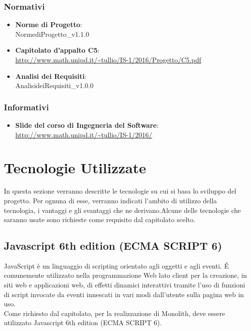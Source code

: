 \subsubsection{Normativi}
\begin{itemize}
	\item \textbf{Norme di Progetto}: \\ NormediProgetto\_v1.1.0
	\item \textbf{Capitolato d'appalto C5}: \\ \url{http://www.math.unipd.it/~tullio/IS-1/2016/Progetto/C5.pdf}
	\item \textbf{Analisi dei Requisiti}: \\ AnalisideiRequisiti\_v1.0.0
	
\end{itemize}


\subsubsection{Informativi}
\begin{itemize}
	\item \textbf{Slide del corso di Ingegneria del Software}: \\  \url{http://www.math.unipd.it/~tullio/IS-1/2016/ }
\end{itemize}

\section{Tecnologie Utilizzate}

In questa sezione verranno descritte le tecnologie su cui si basa lo sviluppo del progetto. Per ognuna di esse, verranno indicati l’ambito di utilizzo della tecnologia, i vantaggi e gli svantaggi che ne derivano.Alcune delle tecnologie che saranno usate sono richieste come requisito dal capitolato scelto.

\subsection{Javascript 6th edition (ECMA SCRIPT 6)}

JavaScript è un linguaggio di scripting orientato agli oggetti e agli eventi. \'E comunemente utilizzato nella programmazione Web lato client per la creazione, in siti web e applicazioni web, di effetti dinamici interattivi tramite l'uso di funzioni di script invocate da eventi innescati in vari modi dall'utente sulla pagina web in uso. \\ Come richiesto dal capitolato, per la realizzazione di Monolith, deve essere utilizzato Javascript 6th edition (ECMA SCRIPT 6). \\

